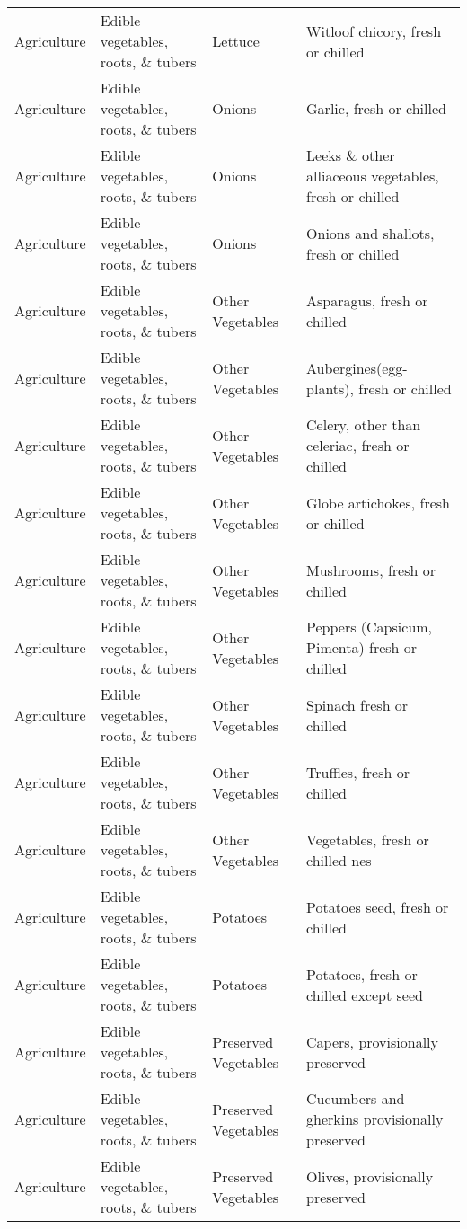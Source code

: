 \begin{appendices}
\begin{xltabular}{\textwidth}{|p{0.07\textwidth}|p{0.28\textwidth}|p{0.24\textwidth}|p{0.31\textwidth}|}
	Agriculture & Edible vegetables, roots, \& tubers & Lettuce & Witloof chicory, fresh or chilled \\
	Agriculture & Edible vegetables, roots, \& tubers & Onions & Garlic, fresh or chilled \\
	Agriculture & Edible vegetables, roots, \& tubers & Onions & Leeks \& other alliaceous vegetables, fresh or chilled \\
	Agriculture & Edible vegetables, roots, \& tubers & Onions & Onions and shallots, fresh or chilled \\
	Agriculture & Edible vegetables, roots, \& tubers & Other Vegetables & Asparagus, fresh or chilled \\
	Agriculture & Edible vegetables, roots, \& tubers & Other Vegetables & Aubergines(egg-plants), fresh or chilled \\
	Agriculture & Edible vegetables, roots, \& tubers & Other Vegetables & Celery, other than celeriac, fresh or chilled \\
	Agriculture & Edible vegetables, roots, \& tubers & Other Vegetables & Globe artichokes, fresh or chilled \\
	Agriculture & Edible vegetables, roots, \& tubers & Other Vegetables & Mushrooms, fresh or chilled \\
	Agriculture & Edible vegetables, roots, \& tubers & Other Vegetables & Peppers (Capsicum, Pimenta) fresh or chilled \\
	Agriculture & Edible vegetables, roots, \& tubers & Other Vegetables & Spinach fresh or chilled \\
	Agriculture & Edible vegetables, roots, \& tubers & Other Vegetables & Truffles, fresh or chilled \\
	Agriculture & Edible vegetables, roots, \& tubers & Other Vegetables & Vegetables, fresh or chilled nes \\
	Agriculture & Edible vegetables, roots, \& tubers & Potatoes & Potatoes seed, fresh or chilled \\
	Agriculture & Edible vegetables, roots, \& tubers & Potatoes & Potatoes, fresh or chilled except seed \\
	Agriculture & Edible vegetables, roots, \& tubers & Preserved Vegetables & Capers, provisionally preserved \\
	Agriculture & Edible vegetables, roots, \& tubers & Preserved Vegetables & Cucumbers and gherkins provisionally preserved \\
	Agriculture & Edible vegetables, roots, \& tubers & Preserved Vegetables & Olives, provisionally preserved \\

\end{xltabular}
\end{appendices}
